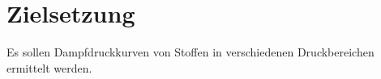 
\section{Zielsetzung}
\label{sec:Zielsetzung}
Es sollen Dampfdruckkurven von Stoffen in verschiedenen
 Druckbereichen ermittelt werden.
